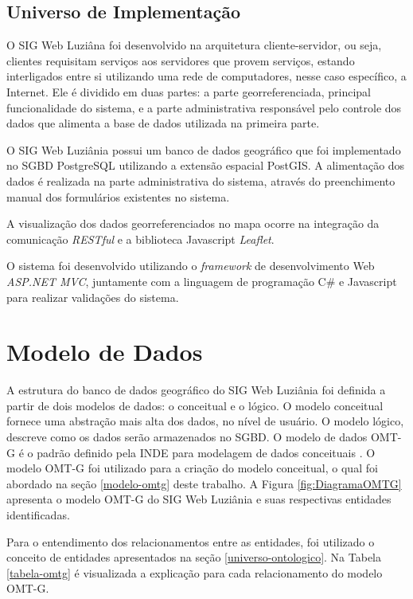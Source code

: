 \subsection{Universo de Implementação}

O SIG Web Luziâna foi desenvolvido na arquitetura cliente-servidor, ou seja, clientes requisitam serviços aos servidores que provem serviços, estando interligados entre si utilizando uma rede de computadores, nesse caso específico, a Internet. Ele é dividido em duas partes: a parte georreferenciada, principal funcionalidade do sistema, e a parte administrativa responsável pelo controle dos dados que alimenta a base de dados utilizada na primeira parte.

O SIG Web Luziânia possui um banco de dados geográfico que foi implementado no SGBD PostgreSQL utilizando a extensão espacial PostGIS. A alimentação dos dados é realizada na parte administrativa do sistema, através do preenchimento manual dos formulários existentes no sistema.

A visualização dos dados georreferenciados no mapa ocorre na integração da comunicação \textit{RESTful} e a biblioteca Javascript \textit{Leaflet}.

O sistema foi desenvolvido utilizando o \textit{framework} de desenvolvimento Web \textit{ASP.NET MVC}, juntamente com a linguagem de programação C\# e Javascript para realizar validações do sistema.

\section{Modelo de Dados}

A estrutura do banco de dados geográfico do SIG Web Luziânia foi definida a partir de dois modelos de dados: o conceitual e o lógico. O modelo conceitual fornece uma abstração mais alta dos dados, no nível de usuário. O modelo lógico, descreve como os dados serão armazenados no SGBD.
O modelo de dados OMT-G é o padrão definido pela INDE para modelagem de dados conceituais \cite{inde}. O modelo OMT-G foi utilizado para a criação do modelo conceitual, o qual foi abordado na seção \ref{modelo-omtg} deste trabalho. A Figura \ref{fig:DiagramaOMTG} apresenta o modelo OMT-G do SIG Web Luziânia e suas respectivas entidades identificadas. 

Para o entendimento dos relacionamentos entre as entidades, foi utilizado o conceito de entidades apresentados na seção \ref{universo-ontologico}. Na Tabela \ref{tabela-omtg} é visualizada a explicação para cada relacionamento do modelo OMT-G.

